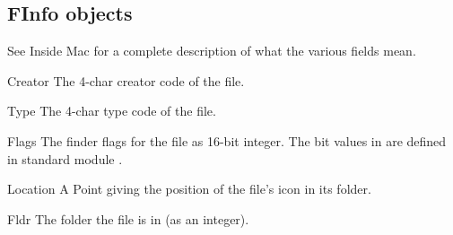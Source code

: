 \subsection{FInfo objects}

See Inside Mac for a complete description of what the various fields
mean.

\begin{datadesc}{Creator}
The 4-char creator code of the file.
\end{datadesc}

\begin{datadesc}{Type}
The 4-char type code of the file.
\end{datadesc}

\begin{datadesc}{Flags}
The finder flags for the file as 16-bit integer. The bit values in
 are defined in standard module .
\end{datadesc}

\begin{datadesc}{Location}
A Point giving the position of the file's icon in its folder.
\end{datadesc}

\begin{datadesc}{Fldr}
The folder the file is in (as an integer).
\end{datadesc}
